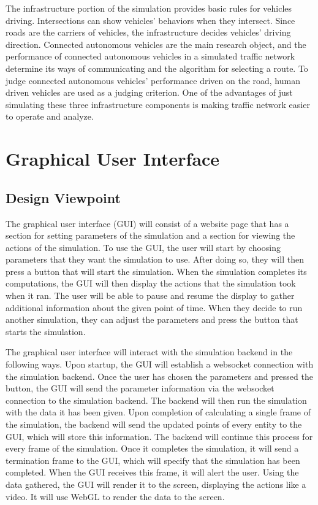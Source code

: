 \documentclass[onecolumn, draftclsnofoot,10pt, compsoc]{IEEEtran}
\begin{document}
The infrastructure portion of the simulation provides basic rules for vehicles driving.
Intersections can show vehicles’ behaviors when they intersect.
Since roads are the carriers of vehicles, the infrastructure decides vehicles’ driving direction.
Connected autonomous vehicles are the main research object, and the performance of connected autonomous vehicles in a simulated traffic network determine its ways of communicating and the algorithm for selecting a route.
To judge connected autonomous vehicles’ performance driven on the road, human driven vehicles are used as a judging criterion.
One of the advantages of just simulating these three infrastructure components is making traffic network easier to operate and analyze.
\section{Graphical User Interface}
\subsection{Design Viewpoint}
The graphical user interface (GUI) will consist of a website page that has a section for setting parameters of the simulation and a section for viewing the actions of the simulation.
To use the GUI, the user will start by choosing parameters that they want the simulation to use.
After doing so, they will then press a button that will start the simulation.
When the simulation completes its computations, the GUI will then display the actions that the simulation took when it ran.
The user will be able to pause and resume the display to gather additional information about the given point of time.
When they decide to run another simulation, they can adjust the parameters and press the button that starts the simulation.

The graphical user interface will interact with the simulation backend in the following ways.
Upon startup, the GUI will establish a websocket connection with the simulation backend.
Once the user has chosen the parameters and pressed the button, the GUI will send the parameter information via the websocket connection to the simulation backend.
The backend will then run the simulation with the data it has been given.
Upon completion of calculating a single frame of the simulation, the backend will send the updated points of every entity to the GUI, which will store this information.
The backend will continue this process for every frame of the simulation.
Once it completes the simulation, it will send a termination frame to the GUI, which will specify that the simulation has been completed.
When the GUI receives this frame, it will alert the user.
Using the data gathered, the GUI will render it to the screen, displaying the actions like a video.
It will use WebGL to render the data to the screen.
\end{document}
